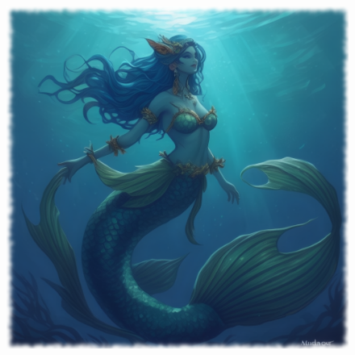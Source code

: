 

\begin{figure}[h]
\begin{center}
\includegraphics[scale=0.24]{img/ai-images/merfolk.png}
\end{center}
\end{figure}
